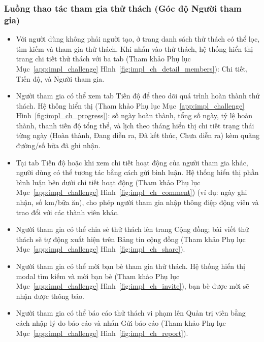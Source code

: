 \subsubsection{Luồng thao tác tham gia thử thách (Góc độ Người tham gia)}
\begin{itemize}
    \item Với người dùng không phải người tạo, ở trang danh sách thử thách có thể lọc, tìm kiếm và tham gia thử thách. Khi nhấn vào thử thách, hệ thống hiển thị trang chi tiết thử thách với ba tab (Tham khảo Phụ lục Mục~\ref{app:impl_challenge} Hình~\ref{fig:impl_ch_detail_members}): Chi tiết, Tiến độ, và Người tham gia.

    \item Người tham gia có thể xem tab Tiến độ để theo dõi quá trình hoàn thành thử thách. Hệ thống hiển thị (Tham khảo Phụ lục Mục~\ref{app:impl_challenge} Hình~\ref{fig:impl_ch_progress}): số ngày hoàn thành, tổng số ngày, tỷ lệ hoàn thành, thanh tiến độ tổng thể, và lịch theo tháng hiển thị chi tiết trạng thái từng ngày (Hoàn thành, Đang diễn ra, Đã kết thúc, Chưa diễn ra) kèm quãng đường/số bữa đã ghi nhận.


    \item Tại tab Tiến độ hoặc khi xem chi tiết hoạt động của người tham gia khác, người dùng có thể tương tác bằng cách gửi bình luận. Hệ thống hiển thị phần bình luận bên dưới chi tiết hoạt động (Tham khảo Phụ lục Mục~\ref{app:impl_challenge} Hình~\ref{fig:impl_ch_comment}) (ví dụ: ngày ghi nhận, số km/bữa ăn), cho phép người tham gia nhập thông điệp động viên và trao đổi với các thành viên khác.


    \item Người tham gia có thể chia sẻ thử thách lên trang Cộng đồng; bài viết thử thách sẽ tự động xuất hiện trên Bảng tin cộng đồng (Tham khảo Phụ lục Mục~\ref{app:impl_challenge} Hình~\ref{fig:impl_ch_share}).


    \item Người tham gia có thể mời bạn bè tham gia thử thách. Hệ thống hiển thị modal tìm kiếm và mời bạn bè (Tham khảo Phụ lục Mục~\ref{app:impl_challenge} Hình~\ref{fig:impl_ch_invite}), bạn bè được mời sẽ nhận được thông báo.


    \item Người tham gia có thể báo cáo thử thách vi phạm lên Quản trị viên bằng cách nhập lý do báo cáo và nhấn Gửi báo cáo (Tham khảo Phụ lục Mục~\ref{app:impl_challenge} Hình~\ref{fig:impl_ch_report}).

\end{itemize}

